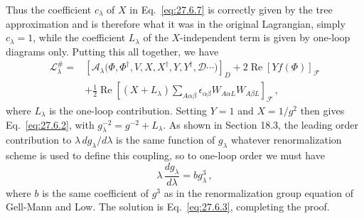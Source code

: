 Thus the coefficient \(c_\lambda\) of \(X\) in Eq.~\eqref{eq:27.6.7} is
correctly given by the tree approximation and is therefore what it was in
the original Lagrangian, simply \(c_\lambda=1\), while the coefficient
\(L_\lambda\) of the \(X\)-independent term is given by one-loop diagrams
only. Putting this all together, we have
\begin{equation}
  \begin{aligned}
  \mathcal{L}^{\#}_\lambda
  ={}&
  \left[
    \mathcal{A}_\lambda
    \bigl(\Phi,\Phi^\dagger,V,X,X^\dagger,Y,Y^\dagger,
    \mathcal{D}\cdots\bigr)
  \right]_D
  +2\operatorname{Re}\left[Yf(\Phi)\right]_{\mathcal{F}}
  \\
  &+\frac12\operatorname{Re}
  \left[
    (X+L_\lambda)
    \sum_{A\alpha\beta}
    \epsilon_{\alpha\beta}W_{A\alpha L}W_{A\beta L}
  \right]_{\mathcal{F}}\,,
  \end{aligned}
  \tag{27.6.13}\label{eq:27.6.13}
\end{equation}
where \(L_\lambda\) is the one-loop contribution. Setting \(Y=1\) and
\(X=1/g^2\) then gives Eq.~\eqref{eq:27.6.2}, with
\(g_\lambda^{-2}=g^{-2}+L_\lambda\). As shown in Section 18.3, the leading
order contribution to \(\lambda\,dg_\lambda/d\lambda\) is the same function
of \(g_\lambda\) whatever renormalization scheme is used to define this
coupling, so to one-loop order we must have
\begin{equation}
  \lambda\,\frac{dg_\lambda}{d\lambda}=bg_\lambda^3\,,
  \tag{27.6.14}\label{eq:27.6.14}
\end{equation}
where \(b\) is the same coefficient of \(g^3\) as in the renormalization
group equation of Gell-Mann and Low. The solution is
Eq.~\eqref{eq:27.6.3}, completing the proof.

